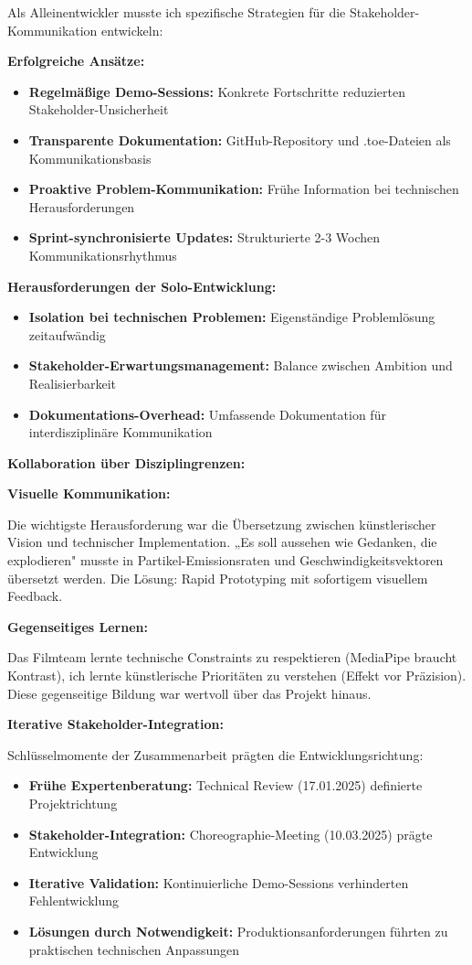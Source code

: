\raggedright Als Alleinentwickler musste ich spezifische Strategien für die Stakeholder-Kommunikation entwickeln:

\textbf{Erfolgreiche Ansätze:}
\begin{itemize}
\item \textbf{Regelmäßige Demo-Sessions:} Konkrete Fortschritte reduzierten Stakeholder-Unsicherheit
\item \textbf{Transparente Dokumentation:} GitHub-Repository und .toe-Dateien als Kommunikationsbasis
\item \textbf{Proaktive Problem-Kommunikation:} Frühe Information bei technischen Herausforderungen
\item \textbf{Sprint-synchronisierte Updates:} Strukturierte 2-3 Wochen Kommunikationsrhythmus
\end{itemize}

\textbf{Herausforderungen der Solo-Entwicklung:}
\begin{itemize}
\item \textbf{Isolation bei technischen Problemen:} Eigenständige Problemlösung zeitaufwändig
\item \textbf{Stakeholder-Erwartungsmanagement:} Balance zwischen Ambition und Realisierbarkeit
\item \textbf{Dokumentations-Overhead:} Umfassende Dokumentation für interdisziplinäre Kommunikation
\end{itemize}

\textbf{Kollaboration über Disziplingrenzen:}

\textbf{Visuelle Kommunikation:}

\raggedright Die wichtigste Herausforderung war die Übersetzung zwischen künstlerischer Vision und technischer Implementation. „Es soll aussehen wie Gedanken, die explodieren" musste in Partikel-Emissionsraten und Geschwindigkeitsvektoren übersetzt werden. Die Lösung: Rapid Prototyping mit sofortigem visuellem Feedback.

\textbf{Gegenseitiges Lernen:}

\raggedright Das Filmteam lernte technische Constraints zu respektieren (MediaPipe braucht Kontrast), ich lernte künstlerische Prioritäten zu verstehen (Effekt vor Präzision). Diese gegenseitige Bildung war wertvoll über das Projekt hinaus.

\textbf{Iterative Stakeholder-Integration:}

Schlüsselmomente der Zusammenarbeit prägten die Entwicklungsrichtung:
\begin{itemize}
\item \textbf{Frühe Expertenberatung:} Technical Review (17.01.2025) definierte Projektrichtung
\item \textbf{Stakeholder-Integration:} Choreographie-Meeting (10.03.2025) prägte Entwicklung
\item \textbf{Iterative Validation:} Kontinuierliche Demo-Sessions verhinderten Fehlentwicklung
\item \textbf{Lösungen durch Notwendigkeit:} Produktionsanforderungen führten zu praktischen technischen Anpassungen
\end{itemize}

